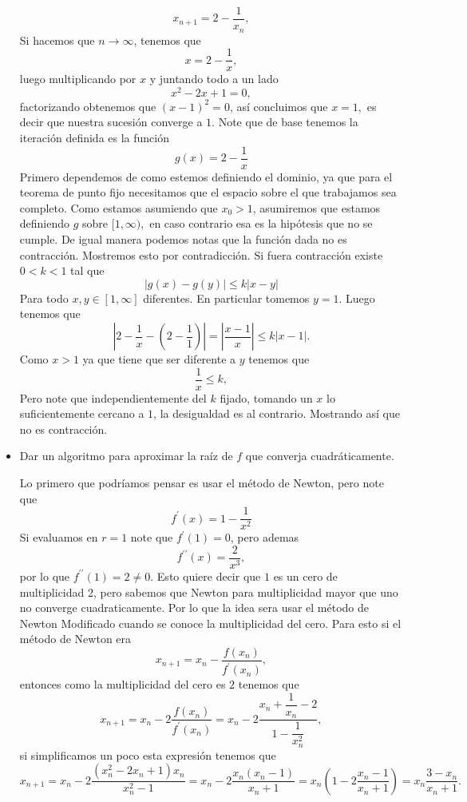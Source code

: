 \begin{itemize}
\begin{sproof}
        $$x_{n+1}=2-\frac{1}{x_n},$$
        Si hacemos que $n\to\infty$, tenemos que 
        $$x=2-\frac{1}{x},$$
        luego multiplicando por $x$ y juntando todo a un lado
        $$x^2-2x+1=0,$$
        factorizando obtenemos que $(x-1)^2=0$, así concluimos que $x=1,$ es decir que nuestra sucesión converge a $1.$
        Note que de base tenemos la iteración definida es la función
        $$g(x)=2-\frac{1}{x}$$
        Primero dependemos de como estemos definiendo el dominio, ya que para el teorema de punto fijo necesitamos que el espacio sobre el que trabajamos sea completo. Como estamos asumiendo que $x_0>1$, asumiremos que estamos definiendo $g$ sobre $[1,\infty),$ en caso contrario esa es la hipótesis que no se cumple. De igual manera podemos notas que la función dada no es contracción. Mostremos esto por contradicción. Si fuera contracción existe $0<k<1$ tal que
        $$\left|g(x)-g(y)\right|\leq k|x-y|$$
        Para todo $x,y\in[1,\infty]$ diferentes. En particular tomemos $y=1.$ Luego tenemos que
        $$\left|2-\frac{1}{x}-\left(2-\frac{1}{1}\right)\right|=\left|\frac{x-1}{x}\right|\leq k|x-1|.$$
        Como $x>1$ ya que tiene que ser diferente a $y$ tenemos que
        $$\frac{1}{x}\leq k,$$
        Pero note que independientemente del $k$ fijado, tomando un $x$ lo suficientemente cercano a $1$, la desigualdad es al contrario. Mostrando así que no es contracción.
    \end{sproof}
    \item Dar un algoritmo para aproximar la raíz de $f$ que converja cuadráticamente.
    \begin{solution}
        Lo primero que podríamos pensar es usar el método de Newton, pero note que
        $$f^\prime(x)=1-\frac{1}{x^2}$$
        Si evaluamos en $r=1$ note que $f^\prime(1)=0$, pero ademas
        $$f^{\prime\prime}(x)=\frac{2}{x^3},$$
        por lo que $f^{\prime\prime}(1)=2\neq 0.$ Esto quiere decir que $1$ es un cero de multiplicidad 2, pero sabemos que Newton para multiplicidad mayor que uno no converge cuadraticamente. Por lo que la idea sera usar el método de Newton Modificado cuando se conoce la multiplicidad del cero. Para esto si el método de Newton era
        $$x_{n+1}=x_{n}-\frac{f(x_n)}{f^\prime(x_n)},$$
        entonces como la multiplicidad del cero es $2$ tenemos que
         $$x_{n+1}=x_{n}-2\frac{f(x_n)}{f^\prime(x_n)}=x_n-2\frac{x_n+\dfrac{1}{x_n}-2}{1-\dfrac{1}{x_n^2}},$$
         si simplificamos un poco esta expresión tenemos que
         $$x_{n+1}=x_n-2\frac{(x_n^2-2x_n+1)x_n}{x_n^2-1}=x_n-2\frac{x_n(x_n-1)}{x_n+1}=x_n\left(1-2\frac{x_n-1}{x_n+1}\right)=x_n\frac{3-x_n}{x_n+1}.$$

\end{solution}
\end{itemize}
